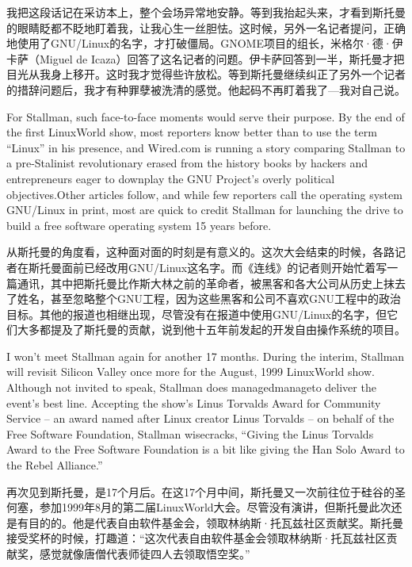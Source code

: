 \ifdefined\chs
我把这段话记在采访本上，整个会场异常地安静。等到我抬起头来，才看到斯托曼的眼睛眨都不眨地盯着我，让我心生一丝胆怯。这时候，另外一名记者提问，正确地使用了GNU/Linux的名字，才打破僵局。GNOME项目的组长，米格尔·德·伊卡萨（Miguel de Icaza）回答了这名记者的问题。伊卡萨回答到一半，斯托曼才把目光从我身上移开。这时我才觉得些许放松。等到斯托曼继续纠正了另外一个记者的措辞问题后，我才有种罪孽被洗清的感觉。他起码不再盯着我了---我对自己说。
\fi

\ifdefined\eng
For Stallman, such face-to-face moments would serve their purpose. By the end of the first LinuxWorld show, most reporters know better than to use the term ``Linux'' in his presence, and Wired.com is running a story comparing Stallman to a pre-Stalinist revolutionary erased from the history books by hackers and entrepreneurs eager to downplay the GNU Project's overly political objectives.\ifdefined\vtwo{}\fi  Other articles follow, and while few reporters call the operating system GNU/Linux in print, most are quick to credit Stallman for launching the drive to build a free software operating system 15 years before.
\fi

\ifdefined\chs
从斯托曼的角度看，这种面对面的时刻是有意义的。这次大会结束的时候，各路记者在斯托曼面前已经改用GNU/Linux这名字。而《连线》的记者则开始忙着写一篇通讯，其中把斯托曼比作斯大林之前的革命者，被黑客和各大公司从历史上抹去了姓名，甚至忽略整个GNU工程，因为这些黑客和公司不喜欢GNU工程中的政治目标\ifdefined\vtwo{}。\fi 其他的报道也相继出现，尽管没有在报道中使用GNU/Linux的名字，但它们大多都提及了斯托曼的贡献，说到他十五年前发起的开发自由操作系统的项目。
\fi

\ifdefined\eng
I won't meet Stallman again for another 17 months. During the interim, Stallman will revisit Silicon Valley once more for the August, 1999 LinuxWorld show. Although not invited to speak, Stallman does \ifdefined\vone managed\fi\ifdefined\vtwo manage\fi to deliver the event's best line. Accepting the show's Linus Torvalds Award for Community Service -- an award named after Linux creator Linus Torvalds -- on behalf of the Free Software Foundation, Stallman wisecracks, ``Giving the Linus Torvalds Award to the Free Software Foundation is a bit like giving the Han Solo Award to the Rebel Alliance.''
\fi

\ifdefined\chs
再次见到斯托曼，是17个月后。在这17个月中间，斯托曼又一次前往位于硅谷的圣何塞，参加1999年8月的第二届LinuxWorld大会。尽管没有演讲，但斯托曼此次还是有目的的。他是代表自由软件基金会，领取林纳斯·托瓦兹社区贡献奖。斯托曼接受奖杯的时候，打趣道：``这次代表自由软件基金会领取林纳斯·托瓦兹社区贡献奖，感觉就像唐僧代表师徒四人去领取悟空奖。''
\fi

